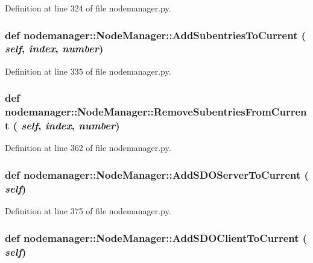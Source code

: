 Definition at line 324 of file nodemanager.py.\hypertarget{classnodemanager_1_1NodeManager_0eaeb35962cff5c762d96ac4849b237f}{
\subsubsection[AddSubentriesToCurrent]{\setlength{\rightskip}{0pt plus 5cm}def nodemanager::Node\-Manager::Add\-Subentries\-To\-Current ( {\em self},  {\em index},  {\em number})}}
\label{classnodemanager_1_1NodeManager_0eaeb35962cff5c762d96ac4849b237f}




Definition at line 335 of file nodemanager.py.\hypertarget{classnodemanager_1_1NodeManager_3712711003c4e7e4c5bfe286acc23170}{
\subsubsection[RemoveSubentriesFromCurrent]{\setlength{\rightskip}{0pt plus 5cm}def nodemanager::Node\-Manager::Remove\-Subentries\-From\-Current ( {\em self},  {\em index},  {\em number})}}
\label{classnodemanager_1_1NodeManager_3712711003c4e7e4c5bfe286acc23170}




Definition at line 362 of file nodemanager.py.\hypertarget{classnodemanager_1_1NodeManager_a9bbd8bc45f3a992d7fdde208bacb2ff}{
\subsubsection[AddSDOServerToCurrent]{\setlength{\rightskip}{0pt plus 5cm}def nodemanager::Node\-Manager::Add\-SDOServer\-To\-Current ( {\em self})}}
\label{classnodemanager_1_1NodeManager_a9bbd8bc45f3a992d7fdde208bacb2ff}




Definition at line 375 of file nodemanager.py.\hypertarget{classnodemanager_1_1NodeManager_7910bb937cd4cf13906b0cd86505674c}{
\subsubsection[AddSDOClientToCurrent]{\setlength{\rightskip}{0pt plus 5cm}def nodemanager::Node\-Manager::Add\-SDOClient\-To\-Current ( {\em self})}}
\label{classnodemanager_1_1NodeManager_7910bb937cd4cf13906b0cd86505674c}




